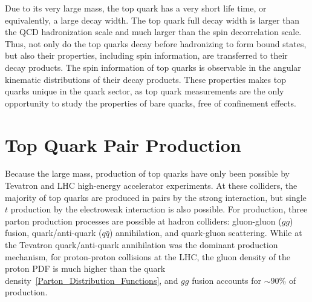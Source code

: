 Due to its very large mass, the top quark has a very short life time, or equivalently, a large decay width.
The top quark full decay width is larger than the QCD hadronization scale and much larger than the spin decorrelation scale.
Thus, not only do the top quarks decay before hadronizing to form bound states, but also their properties, including spin information, are transferred to their decay products.
The spin information of top quarks is observable in the angular kinematic distributions of their decay products.
These properties makes top quarks unique in the quark sector, as top quark measurements are the only opportunity to study the properties of bare quarks, free of confinement effects.

\section{Top Quark Pair Production}
Because the large mass, production of top quarks have only been possible by Tevatron and LHC high-energy accelerator experiments.
At these colliders, the majority of top quarks are produced in \ttbar pairs by the strong interaction, but single $t$ production by the electroweak interaction is also possible.
For \ttbar production, three parton production processes are possible at hadron colliders: gluon-gluon ($gg$) fusion, quark/anti-quark ($q\bar{q}$) annihilation, and quark-gluon scattering.
While at the Tevatron quark$\slash$anti-quark annihilation was the dominant production mechanism, for \beamenergy proton-proton collisions at the LHC, the gluon density of the proton PDF is much higher than the quark density~\ref{Parton_Distribution_Functions}, and $gg$ fusion accounts for $\sim 90 \%$ of \ttbar production.

